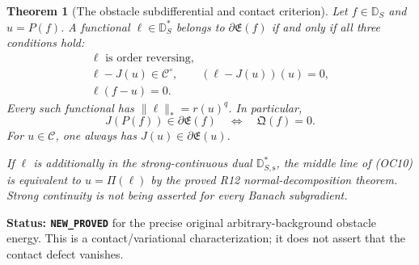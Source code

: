 \documentclass[11pt,a4paper]{article}
\numberwithin{equation}{section}
\newtheorem{theorem}{Theorem}[section]
\theoremstyle{definition}
\theoremstyle{remark}
\begin{document}
\begin{theorem}[The obstacle subdifferential and contact criterion]
\label{thm:r12-obstacle-subdifferential}
Let $f\in\mathbb D_S$ and $u=P(f)$.  A functional
$\ell\in\mathbb D_S^*$ belongs to $\partial\mathfrak E(f)$
if and only if all three conditions hold:
\[
 \begin{gathered}
 \ell\text{ is order reversing},\\
 \ell-J(u)\in\mathscr C^\circ,
                   \qquad (\ell-J(u))(u)=0,\\
                         \ell(f-u)=0.
 \end{gathered}
 \tag{OC10}
\]
Every such functional has $\|\ell\|_*=r(u)^q$.
In particular,
\[
       \boxed{\quad J(P(f))\in\partial\mathfrak E(f)
                        \quad\Longleftrightarrow\quad
                         \mathfrak Q(f)=0.\quad}
 \tag{OC11}
\]
For $u\in\mathscr C$, one always has
$J(u)\in\partial\mathfrak E(u)$.

If $\ell$ is additionally in the strong-continuous dual
$\mathbb D_{S,\mathrm s}^*$, the middle line of
\textup{(OC10)} is equivalent to $u=\Pi(\ell)$ by the
proved R12 normal-decomposition theorem.  Strong continuity
is not being asserted for every Banach subgradient.
\end{theorem}

\noindent\textbf{Status: \texttt{NEW\_PROVED}} for the
precise original arbitrary-background obstacle energy.  This is
a contact/variational characterization; it does not assert
that the contact defect vanishes.
\end{document}
